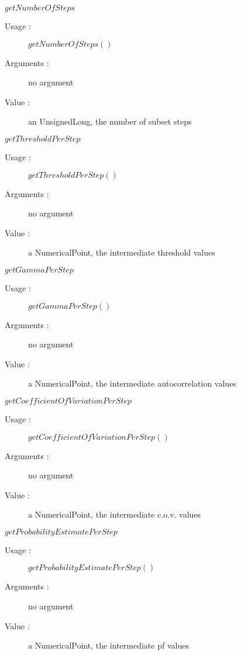 \begin{description}
  \item $getNumberOfSteps$
    \begin{description}
    \item[Usage :] $getNumberOfSteps()$
    \item[Arguments :] no argument
    \item[Value :] an UnsignedLong, the number of subset steps
    \end{description}
    \bigskip

  \item $getThresholdPerStep$
    \begin{description}
    \item[Usage :] $getThresholdPerStep()$
    \item[Arguments :] no argument
    \item[Value :] a NumericalPoint, the intermediate threshold values
    \end{description}
    \bigskip

  \item $getGammaPerStep$
    \begin{description}
    \item[Usage :] $getGammaPerStep()$
    \item[Arguments :] no argument
    \item[Value :] a NumericalPoint, the intermediate autocorrelation values
    \end{description}
    \bigskip  
    
   \item $getCoefficientOfVariationPerStep$
    \begin{description}
    \item[Usage :] $getCoefficientOfVariationPerStep()$
    \item[Arguments :] no argument
    \item[Value :] a NumericalPoint, the intermediate c.o.v. values
    \end{description}
    \bigskip  
      
  \item $getProbabilityEstimatePerStep$
    \begin{description}
    \item[Usage :] $getProbabilityEstimatePerStep()$
    \item[Arguments :] no argument
    \item[Value :] a NumericalPoint, the intermediate pf values
    \end{description}
    \bigskip 
    

\end{description}
